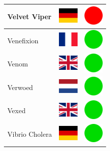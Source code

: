 \documentclass[12pt, a4paper, twoside]{report}
\begin{document}
\begin{center}
\begin{longtable}{|p{5cm}|p{2cm}|p{2cm}|}
 Velvet Viper                                               & \includegraphics[width=1cm]{../img/flags/de} &   \includegraphics[width=1cm]{../likes/n} \\ \hline
 Venefixion                                                 & \includegraphics[width=1cm]{../img/flags/fr} &   \includegraphics[width=1cm]{../likes/y} \\ \hline
 Venom                                                      & \includegraphics[width=1cm]{../img/flags/gb} &   \includegraphics[width=1cm]{../likes/y} \\ \hline
 Verwoed                                                    & \includegraphics[width=1cm]{../img/flags/nl} &   \includegraphics[width=1cm]{../likes/y} \\ \hline
 Vexed                                                      & \includegraphics[width=1cm]{../img/flags/gb} &   \includegraphics[width=1cm]{../likes/y} \\ \hline
 Vibrio Cholera                                             & \includegraphics[width=1cm]{../img/flags/de} &   \includegraphics[width=1cm]{../likes/y} \\ \hline

\end{longtable}
\end{center}
\end{document}
